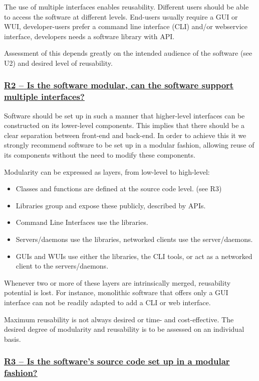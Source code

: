 \documentclass[a4paper,11pt]{article}
\newcommand{\indicator}[1]{\subsubsection*{\underline{#1}}}
\begin{document}
The use of multiple interfaces enables reusability. Different users should be
able to access the software at different levels. End-users usually require a
GUI or WUI, developer-users prefer a command line interface (CLI) and/or
webservice interface, developers needs a software library with API.

Assessment of this depends greatly on the intended audience of the software
(see U2) and desired level of reusability.

\newcommand{\rTwoName}{R2}
\newcommand{\rTwoID}{\rTwoName}
\newcommand{\rTwoText}{Is the software modular, can the software support multiple interfaces?}
\indicator{\rTwoName{ }--{ }\rTwoText}\label{id:r2} 

Software should be set up in such a manner that higher-level interfaces can be
constructed on its lower-level components. This implies that there should be a
clear separation between front-end and back-end. In order to achieve this it we
strongly recommend software to be set up in a modular fashion, allowing reuse
of its components without the need to modify these components.

Modularity can be expressed as layers, from low-level to high-level:

\begin{itemize}
 \item Classes and functions are defined at the source code level. (see R3)
 \item Libraries group and expose these publicly, described by APIs. 
 \item Command Line Interfaces use the libraries.
 \item Servers/daemons use the libraries, networked clients use the server/daemons.
 \item GUIs and WUIs use either the libraries, the CLI tools, or act as a networked client to the servers/daemons.
\end{itemize}

Whenever two or more of these layers are intrinsically merged, reusability potential is lost.
For instance, monolithic software that offers only a GUI interface can not be
readily adapted to add a CLI or web interface.

Maximum reusability is not always desired or time- and cost-effective. The
desired degree of modularity and reusability is to be assessed on an
individual basis.

\newcommand{\rThreeName}{R3}
\newcommand{\rThreeID}{\rThreeName}
\newcommand{\rThreeText}{Is the software's source code set up in a modular fashion?}
\indicator{\rThreeName{ }--{ }\rThreeText}\label{id:r3} 
%
%
%
\end{document}
